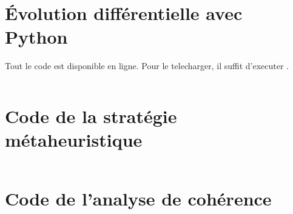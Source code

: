 \begin{appendices}
  
\chapter{Évolution différentielle avec Python}
\scriptsize   Tout le code est disponible en ligne. Pour le telecharger, il suffit d'executer .
  \inputminted[mathescape,
               linenos,
               numbersep=5pt,
               frame=lines,
               framesep=2mm,
               breaklines=true,
               fontsize=\scriptsize]{Python}{/home/youssef/PycharmProjects/DEPV/objects.py}
               
  
\chapter{Code de la stratégie métaheuristique}
  
    \inputminted[mathescape,
               linenos,
               numbersep=5pt,
               frame=lines,
               framesep=2mm,
               breaklines=true,
               fontsize=\scriptsize]{Python}{/home/youssef/PycharmProjects/DEPV/metaheuristic.py}
               
\chapter{Code de l'analyse de cohérence}
\inputminted[mathescape,
               linenos,
               numbersep=5pt,
               frame=lines,
               framesep=2mm,
               breaklines=true,
               fontsize=\scriptsize]{Python}{/home/youssef/PycharmProjects/DEPV/consistency.py}
\inputminted[mathescape,
               linenos,
               numbersep=5pt,
               frame=lines,
               framesep=2mm,
               breaklines=true,
               fontsize=\scriptsize]{Python}{/home/youssef/PycharmProjects/DEPV/metaconsistency.py}
               

\end{appendices}
